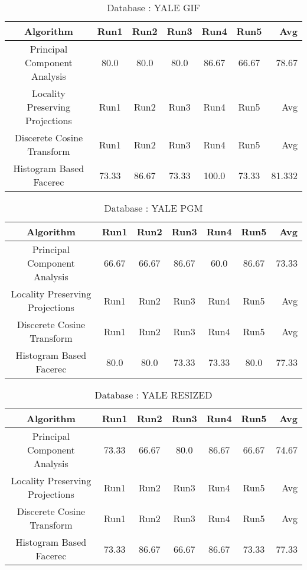 \documentclass[10pt,a4paper]{article}
\begin{document}
\begin{center}
\begin{table}
\caption{Database : YALE GIF}
\centering
\begin{tabular}{| c | c | c | c | c | c | r | } \hline 
Algorithm & Run1 & Run2 & Run3 & Run4 & Run5 & Avg  \\  
\hline
Principal Component Analysis & 80.0 & 80.0 & 80.0 & 86.67 & 66.67 & 78.67 \\
\hline
Locality Preserving Projections & Run1 & Run2 & Run3 & Run4 & Run5 & Avg \\
\hline
Discerete Cosine Transform & Run1 & Run2 & Run3 & Run4 & Run5 & Avg \\
\hline
Histogram Based Facerec & 73.33 & 86.67 & 73.33 & 100.0 & 73.33 & 81.332 \\
\hline
\end{tabular}
\end{table}


\begin{table}
\caption{Database : YALE PGM} 

\centering
\begin{tabular}{| c | c | c | c | c | c | r | } \hline 
Algorithm & Run1 & Run2 & Run3 & Run4 & Run5 & Avg  \\  
\hline
Principal Component Analysis & 66.67 & 66.67 & 86.67 & 60.0 & 86.67 & 73.33 \\
\hline
Locality Preserving Projections & Run1 & Run2 & Run3 & Run4 & Run5 & Avg \\
\hline
Discerete Cosine Transform & Run1 & Run2 & Run3 & Run4 & Run5 & Avg \\
\hline
Histogram Based Facerec & 80.0 & 80.0 & 73.33 & 73.33 & 80.0 & 77.33 \\
\hline
\end{tabular}
\end{table}

\begin{table}
\caption{Database : YALE RESIZED}
\centering
\begin{tabular}{| c | c | c | c | c | c | r | } \hline 
Algorithm & Run1 & Run2 & Run3 & Run4 & Run5 & Avg  \\  
\hline
Principal Component Analysis & 73.33 & 66.67 & 80.0 & 86.67 & 66.67 & 74.67 \\
\hline
Locality Preserving Projections & Run1 & Run2 & Run3 & Run4 & Run5 & Avg \\
\hline
Discerete Cosine Transform & Run1 & Run2 & Run3 & Run4 & Run5 & Avg \\
\hline
Histogram Based Facerec & 73.33 & 86.67 & 66.67 & 86.67 & 73.33 & 77.33 \\
\hline
\end{tabular}
\end{table}


\end{center}
\end{document}
